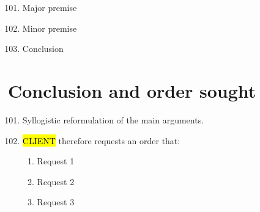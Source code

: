 \begin{enumerate}
    \setcounter{enumi}{100}
    \item Major premise
    \item Minor premise
    \item Conclusion
    
\end{enumerate}

\break

\section{Conclusion and order sought}

\begin{enumerate}
    \setcounter{enumi}{100}
    
    \item Syllogistic reformulation of the main arguments.
    
    \item \hl{CLIENT} therefore requests an order that:
    
    \begin{enumerate}
        \item Request 1
    
        \item Request 2
    
        \item Request 3
    
    \end{enumerate}
    
\end{enumerate}

\pagebreak